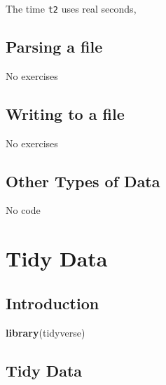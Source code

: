 \documentclass[]{book}
\newenvironment{Shaded}{\begin{snugshade}}{\end{snugshade}}
\newcommand{\CommentTok}[1]{\textcolor[rgb]{0.56,0.35,0.01}{\textit{#1}}}
\newcommand{\KeywordTok}[1]{\textcolor[rgb]{0.13,0.29,0.53}{\textbf{#1}}}
\newcommand{\NormalTok}[1]{#1}
\newcommand{\StringTok}[1]{\textcolor[rgb]{0.31,0.60,0.02}{#1}}
\theoremstyle{plain}
\theoremstyle{remark}
\theoremstyle{definition}
\theoremstyle{definition}
\theoremstyle{definition}
\theoremstyle{remark}
\begin{document}
The time \texttt{t2} uses real seconds,

\begin{Shaded}
\end{Shaded}

\hypertarget{parsing-a-file}{%
\section{Parsing a file}\label{parsing-a-file}}

No exercises

\hypertarget{writing-to-a-file}{%
\section{Writing to a file}\label{writing-to-a-file}}

No exercises

\hypertarget{other-types-of-data}{%
\section{Other Types of Data}\label{other-types-of-data}}

No code

\hypertarget{tidy-data}{%
\chapter{Tidy Data}\label{tidy-data}}

\hypertarget{introduction-7}{%
\section{Introduction}\label{introduction-7}}

\begin{Shaded}
\begin{Highlighting}[]
\KeywordTok{library}\NormalTok{(tidyverse)}
\end{Highlighting}
\end{Shaded}

\hypertarget{tidy-data-1}{%
\section{Tidy Data}\label{tidy-data-1}}
\end{document}

